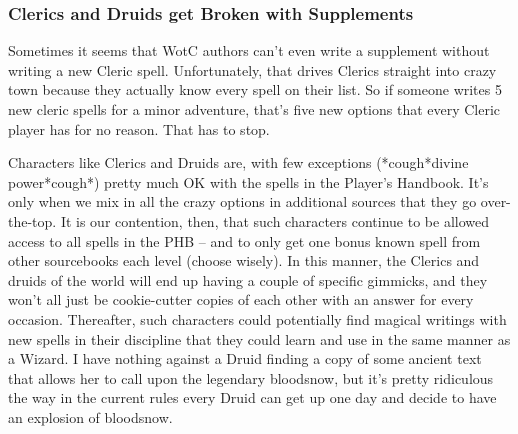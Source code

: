 \subsubsection{Clerics and Druids get Broken with Supplements}

Sometimes it seems that WotC authors can't even write a supplement without writing a new Cleric spell. Unfortunately, that drives Clerics straight into crazy town because they actually know every spell on their list. So if someone writes 5 new cleric spells for a minor adventure, that's five new options that every Cleric player has for no reason. That has to stop.

Characters like Clerics and Druids are, with few exceptions (*cough*divine power*cough*) pretty much OK with the spells in the Player's Handbook. It's only when we mix in all the crazy options in additional sources that they go over-the-top. It is our contention, then, that such characters continue to be allowed access to all spells in the PHB -- and to only get one bonus known spell from other sourcebooks each level (choose wisely). In this manner, the Clerics and druids of the world will end up having a couple of specific gimmicks, and they won't all just be cookie-cutter copies of each other with an answer for every occasion. Thereafter, such characters could potentially find magical writings with new spells in their discipline that they could learn and use in the same manner as a Wizard. I have nothing against a Druid finding a copy of some ancient text that allows her to call upon the legendary bloodsnow, but it's pretty ridiculous the way in the current rules every Druid can get up one day and decide to have an explosion of bloodsnow.
